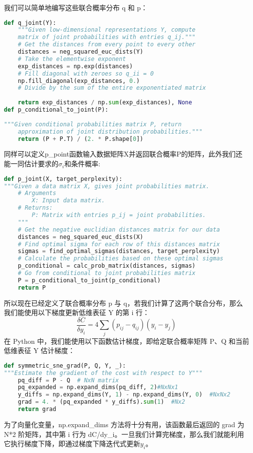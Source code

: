 我们可以简单地编写这些联合概率分布 q 和 p：
\begin{lstlisting}[language=Python]
def q_joint(Y):    
    """Given low-dimensional representations Y, compute
    matrix of joint probabilities with entries q_ij."""
    # Get the distances from every point to every other
    distances = neg_squared_euc_dists(Y)    
    # Take the elementwise exponent
    exp_distances = np.exp(distances)  
    # Fill diagonal with zeroes so q_ii = 0
    np.fill_diagonal(exp_distances, 0.)
    # Divide by the sum of the entire exponentiated matrix
    
    return exp_distances / np.sum(exp_distances), None
def p_conditional_to_joint(P):
    
"""Given conditional probabilities matrix P, return
    approximation of joint distribution probabilities."""
    return (P + P.T) / (2. * P.shape[0])
\end{lstlisting}
同样可以定义p\_point函数输入数据矩阵X并返回联合概率P的矩阵，此外我们还能一同估计要求的$\sigma_i$和条件概率:
\begin{lstlisting}[language=Python]
def p_joint(X, target_perplexity):    
"""Given a data matrix X, gives joint probabilities matrix.
    # Arguments
        X: Input data matrix.
    # Returns:
        P: Matrix with entries p_ij = joint probabilities.
    """
    # Get the negative euclidian distances matrix for our data
    distances = neg_squared_euc_dists(X)    
    # Find optimal sigma for each row of this distances matrix
    sigmas = find_optimal_sigmas(distances, target_perplexity)
    # Calculate the probabilities based on these optimal sigmas
    p_conditional = calc_prob_matrix(distances, sigmas)
    # Go from conditional to joint probabilities matrix
    P = p_conditional_to_joint(p_conditional)
    return P
\end{lstlisting}
所以现在已经定义了联合概率分布 p 与 q，若我们计算了这两个联合分布，那么我们能使用以下梯度更新低维表征 Y 的第 i 行：
\begin{equation}\label{eq:sne9}
	\frac{\delta C}{\delta y_i}=4\sum_j{(p_{ij}-q_{ij})(y_i-y_j)}
\end{equation}
在 Python 中，我们能使用以下函数估计梯度，即给定联合概率矩阵 P、Q 和当前低维表征 Y 估计梯度：
\begin{lstlisting}[language=Python]
def symmetric_sne_grad(P, Q, Y, _):    
"""Estimate the gradient of the cost with respect to Y"""
    pq_diff = P - Q  # NxN matrix
    pq_expanded = np.expand_dims(pq_diff, 2)#NxNx1
    y_diffs = np.expand_dims(Y, 1) - np.expand_dims(Y, 0)  #NxNx2
    grad = 4. * (pq_expanded * y_diffs).sum(1)  #Nx2    
    return grad 
\end{lstlisting}
为了向量化变量，np.expand\_dims 方法将十分有用，该函数最后返回的 grad 为 N*2 阶矩阵，其中第 i 行为 dC/dy\_i。一旦我们计算完梯度，那么我们就能利用它执行梯度下降，即通过梯度下降迭代式更新$ y_i$。

